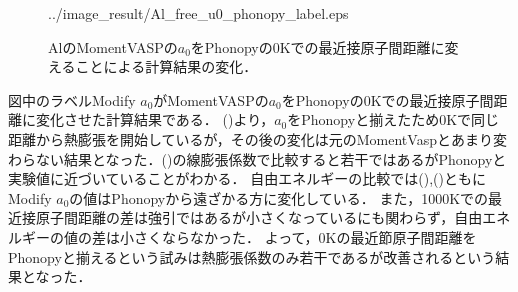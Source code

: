 \begin{figure}[htbp]
\begin{minipage}[b]{0.5\linewidth}
  {../image_result/Al_free_u0_phonopy_label.eps}
  \label{a0test4}
 \end{minipage}
 \caption{AlのMomentVASPの$a_0$をPhonopyの0Kでの最近接原子間距離に変えることによる計算結果の変化．}\label{fig:a0test}
\end{figure}

図中のラベルModify $a_0$がMomentVASPの$a_0$をPhonopyの0Kでの最近接原子間距離に変化させた計算結果である．
()より，$a_0$をPhonopyと揃えたため0Kで同じ距離から熱膨張を開始しているが，その後の変化は元のMomentVaspとあまり変わらない結果となった．()の線膨張係数で比較すると若干ではあるがPhonopyと実験値に近づいていることがわかる．
自由エネルギーの比較では(),()ともにModify $a_0$の値はPhonopyから遠ざかる方に変化している．
また，1000Kでの最近接原子間距離の差は強引ではあるが小さくなっているにも関わらず，自由エネルギーの値の差は小さくならなかった．
よって，0Kの最近節原子間距離をPhonopyと揃えるという試みは熱膨張係数のみ若干であるが改善されるという結果となった．

